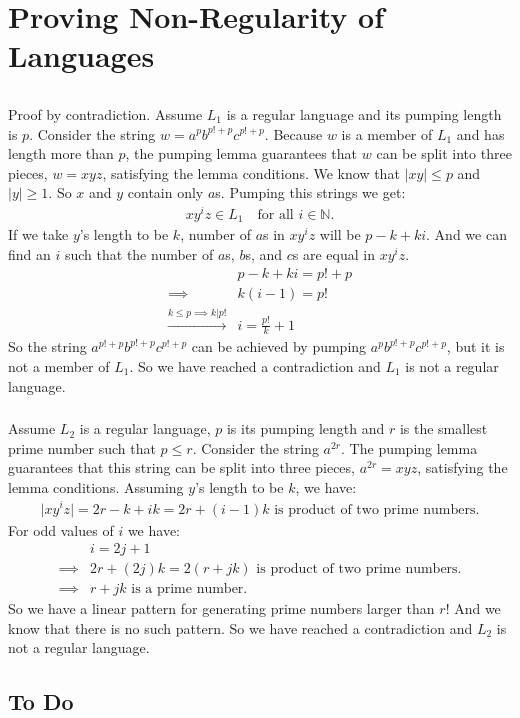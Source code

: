 \documentclass{article}
\numberwithin{equation}{subsection}
\newcommand{\abs}[1]{\vert #1\vert}
\begin{document}
\section{Proving Non-Regularity of Languages}
\subsection{}
\subsubsection{}
Proof by contradiction.
Assume \(L_1\) is a regular language and its pumping length is \(p\).
Consider the string \(w = a^pb^{p!+p}c^{p!+p}\).
Because \(w\) is a member of \(L_1\) and has length more than \(p\), the pumping lemma guarantees that \(w\) can be split into three pieces, \(w = xyz\), satisfying the lemma conditions.
We know that \(\vert xy\vert \le p\) and \(\vert y\vert \ge 1\).
So \(x\) and \(y\) contain only \(a\)s.
Pumping this strings we get:
\begin{gather}
xy^iz \in L_1 \quad \text{for all } i \in \mathbb{N}.
\end{gather}
If we take \(y\)'s length to be \(k\), number of \(a\)s in \(xy^iz\) will be \(p-k+ki\).
And we can find an \(i\) such that the number of \(a\)s, \(b\)s, and \(c\)s are equal in \(xy^iz\).
\begin{align}
&p - k + ki = p! + p\\
\implies & k(i-1) = p!\\
\xrightarrow{k \le p \implies k|p!} & i = \frac{p!}{k}+1
\end{align}
So the string \(a^{p!+p}b^{p!+p}c^{p!+p}\) can be achieved by pumping \(a^pb^{p!+p}c^{p!+p}\), but it is not a member of \(L_1\).
So we have reached a contradiction and \(L_1\) is not a regular language.

\subsubsection{}
Assume \(L_2\) is a regular language, \(p\) is its pumping length and \(r\) is the smallest prime number such that \(p \le r\).
Consider the string \(a^{2r}\).
The pumping lemma guarantees that this string can be split into three pieces, \(a^{2r} = xyz\), satisfying the lemma conditions.
Assuming \(y\)'s length to be \(k\), we have:
\begin{align}
\abs{xy^iz} = 2r - k + ik = 2r + (i-1)k \text{ is product of two prime numbers.}
\end{align}
For odd values of \(i\) we have:
\begin{align}
&i = 2j + 1\\
\implies & 2r + (2j)k = 2(r + jk) \text{ is product of two prime numbers.}\\
\implies & r + jk \text{ is a prime number.}
\end{align}
So we have a linear pattern for generating prime numbers larger than \(r\)!
And we know that there is no such pattern.
So we have reached a contradiction and \(L_2\) is not a regular language.

\subsection{To Do}
\end{document}
